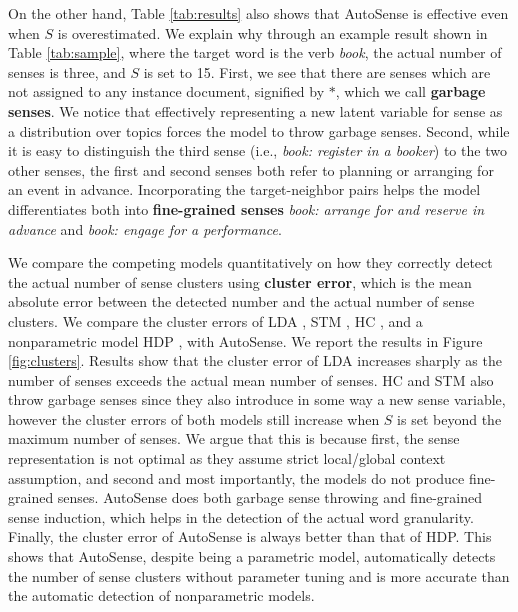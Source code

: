 \documentclass[letterpaper]{article}
\begin{document}
On the other hand, Table \ref{tab:results} also shows that AutoSense is effective even when $S$ is overestimated. We explain why through an example result shown in Table \ref{tab:sample}, where the target word is the verb \textit{book}, the actual number of senses is three, and $S$ is set to 15. First, we see that there are senses which are not assigned to any instance document, signified by $*$, which we call \textbf{garbage senses}. We notice that effectively representing a new latent variable for sense as a distribution over topics forces the model to throw garbage senses. Second, while it is easy to distinguish the third sense (i.e., \textit{book: register in a booker}) to the two other senses, the first and second senses both refer to planning or arranging for an event in advance. Incorporating the target-neighbor pairs helps the model differentiates both into \textbf{fine-grained senses} \textit{book: arrange for and reserve in advance} and \textit{book: engage for a performance}.

We compare the competing models quantitatively on how they correctly detect the actual number of sense clusters using \textbf{cluster error}, which is the mean absolute error between the detected number and the actual number of sense clusters. We compare the cluster errors of LDA \cite{blei2003latent}, STM \cite{wang2015sense}, HC \cite{chang2014inducing}, and a nonparametric model HDP \cite{teh2004sharing}, with AutoSense. We report the results in Figure \ref{fig:clusters}. Results show that the cluster error of LDA increases sharply as the number of senses exceeds the actual mean number of senses. HC and STM also throw garbage senses since they also introduce in some way a new sense variable, however the cluster errors of both models still increase when $S$ is set beyond the maximum number of senses. We argue that this is because first, the sense representation is not optimal as they assume strict local/global context assumption, and second and most importantly, the models do not produce fine-grained senses. AutoSense does both garbage sense throwing and fine-grained sense induction, which helps in the detection of the actual word granularity. Finally, the cluster error of AutoSense is always better than that of HDP. This shows that AutoSense, despite being a parametric model, automatically detects the number of sense clusters without parameter tuning and is more accurate than the automatic detection of nonparametric models.
\end{document}
